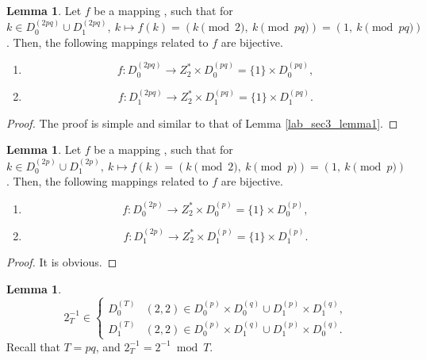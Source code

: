 \documentclass{mcom-l}
\theoremstyle{definition}
\newtheorem{sec3lemma2}[sec3lemma1]{Lemma}
\newtheorem{sec3lemma3}[sec3lemma1]{Lemma}
\newtheorem{sec3lemma4}[sec3lemma1]{Lemma}
\numberwithin{equation}{section}
\begin{document}
        \begin{sec3lemma2}\label{lab_sec3_lemma2}
          Let $ f $ be a mapping , such that for $ k\in D_{0}^{(2pq)}\cup D_{1}^{(2pq)},\  k\mapsto f(k)=(k\pmod 2,\ k\pmod{pq} )= (1,\ k\pmod{pq} )$. Then, the following mappings related to $ f $ are bijective.
          \begin{enumerate} \item
          \begin{equation*}
          f:D_{0}^{(2pq)}\rightarrow Z^{*}_{2}\times D_{0}^{(pq)}=\lbrace 1\rbrace \times D_{0}^{(pq)},
          \end{equation*}
          \item
          \begin{equation*}
          f:D_{1}^{(2pq)}\rightarrow Z^{*}_{2}\times D_{1}^{(pq)}=\lbrace 1\rbrace \times D_{1}^{(pq)}.
          \end{equation*}
          \end{enumerate}
          \end{sec3lemma2}
          \begin{proof}
          The proof is simple and similar to that of Lemma \ref{lab_sec3_lemma1}.
          \end{proof}
          \begin{sec3lemma3}\label{lab_sec3_lemma3}
          Let $ f $ be a mapping , such that for $ k\in D_{0}^{(2p)}\cup D_{1}^{(2p)},\  k\mapsto f(k)=(k\pmod 2,\ k\pmod{p} )= (1,\ k\pmod{p} )$. Then, the following mappings related to $ f $ are bijective.
          \begin{enumerate} \item
          \begin{equation*}
          f:D_{0}^{(2p)}\rightarrow Z^{*}_{2}\times D_{0}^{(p)}=\lbrace 1\rbrace \times D_{0}^{(p)},
          \end{equation*}
          \item
          \begin{equation*}
          f:D_{1}^{(2p)}\rightarrow Z^{*}_{2}\times D_{1}^{(p)}=\lbrace 1\rbrace \times D_{1}^{(p)}.
          \end{equation*}
          \end{enumerate}
          \end{sec3lemma3}
          \begin{proof}
          It is obvious.
          \end{proof}
          \begin{sec3lemma4}\label{lab_sec3_lemma4}
          \begin{equation}\label{sec3_lemma4_proof_eq1}
          2_{T}^{-1}\in
          \begin{cases}
          D_{0}^{(T)}&(2,2)\in D_{0}^{(p)}\times D_{0}^{(q)}\cup D_{1}^{(p)}\times D_{1}^{(q)},\\
          D_{1}^{(T)}&(2,2)\in D_{0}^{(p)}\times D_{1}^{(q)}\cup D_{1}^{(p)}\times D_{0}^{(q)}.
          \end{cases}
          \end{equation}
          Recall that $ T=pq $, and $ 2_{T}^{-1}=2^{-1}\bmod T$.
          \end{sec3lemma4}
\end{document}
